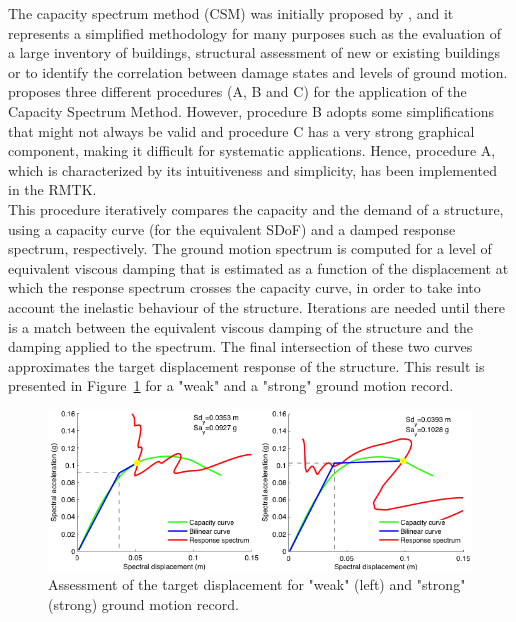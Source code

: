 The capacity spectrum method (CSM) was initially proposed by \citep{FreemanEtAl1975}, and it represents a simplified methodology for many purposes such as the evaluation of a large inventory of buildings, structural assessment of new or existing buildings or to identify the correlation between damage states and levels of ground motion. \citet{ATC1996} proposes three different procedures (A, B and C) for the application of the Capacity Spectrum Method. However, procedure B adopts some simplifications that might not always be valid and procedure C has a very strong graphical component, making it difficult for systematic applications. Hence, procedure A, which is characterized by its intuitiveness and simplicity, has been implemented in the RMTK.\\

This procedure iteratively compares the capacity and the demand of a structure, using a capacity curve (for the equivalent SDoF) and a damped response spectrum, respectively. The ground motion spectrum is computed for a level of equivalent viscous damping that is estimated as a function of the displacement at which the response spectrum crosses the capacity curve, in order to take into account the inelastic behaviour of the structure. Iterations are needed until there is a match between the equivalent viscous damping of the structure and the damping applied to the spectrum. The final intersection of these two curves approximates the target displacement response of the structure. This result is presented in Figure~\ref{fig:per_point} for a "weak" and a "strong" ground motion record. \\

\begin{figure}[htb]
  \centering
      \includegraphics[width=12cm]{figures/performance_points.png}
  \caption{Assessment of the target displacement for "weak" (left) and "strong" (strong) ground motion record.}
  \label{fig:per_point}
\end{figure}

